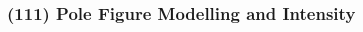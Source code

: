 \documentclass[]{beamer}%
\begin{document}
\begin{frame}
    \frametitle{(111) Pole Figure Modelling and Intensity}
    \begin{columns}
        \begin{column}{0.5\textwidth}
            \begin{figure}

\end{figure}
\end{column}
\end{columns}
\end{frame}
\end{document}
